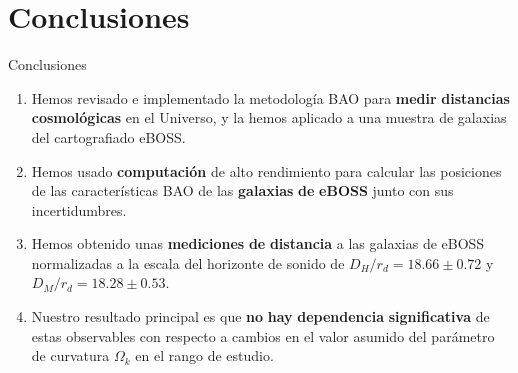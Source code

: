 \documentclass{beamer}
\begin{document}
\section{Conclusiones}
\begin{frame}[allowframebreaks]{Conclusiones}

\begin{enumerate}
\item Hemos revisado e implementado la metodología BAO para \textbf{medir} \textbf{distancias} \textbf{cosmológicas} en el Universo, y la hemos aplicado a una muestra de galaxias del cartografiado eBOSS.
\item Hemos usado \textbf{computación} de alto rendimiento para calcular las posiciones de las características BAO de las \textbf{galaxias} \textbf{de} \textbf{eBOSS} junto con sus incertidumbres. 
\item Hemos obtenido unas \textbf{mediciones} \textbf{de} \textbf{distancia} a las galaxias de eBOSS normalizadas a la escala del horizonte de sonido de $D_H/r_d = 18.66 \pm 0.72$ y $D_M/r_d = 18.28 \pm 0.53$.
\item Nuestro resultado principal es que \textbf{no} \textbf{hay} \textbf{dependencia} \textbf{significativa} de estas observables con respecto a cambios en el valor asumido del parámetro de curvatura $ \Omega_k$ en el rango de estudio.
\end{enumerate}

\end{frame}
\end{document}
